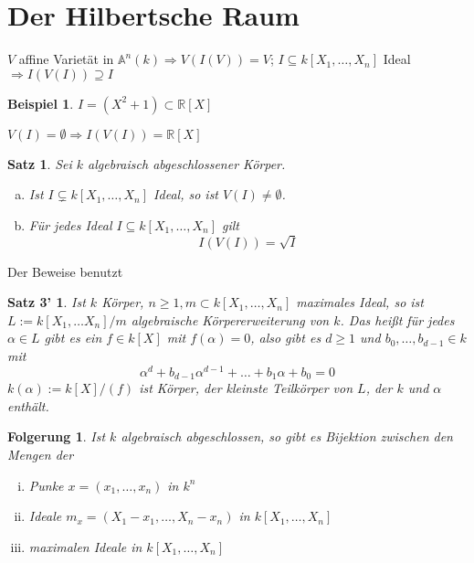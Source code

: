\documentclass[a4paper, 12pt, numbers=noendperiod, chapterprefix=true]{scrbook}
\theoremstyle{break}
\newtheorem{Satz}{Satz}
\newtheorem{Folg}[Def]{Folgerung}
\theoremstyle{nonumberbreak}
\newtheorem{nnBsp}{Beispiel}
\newtheorem{nnSatz3}{Satz 3'} %
\theoremstyle{nonumberplain}
\newcommand{\R}{\mathbb{R}}
\newcommand{\A}{\mathbb{A}}
\begin{document}

\section{Der Hilbertsche Raum}

$V$ affine Variet\"at in $ \A ^n(k) \Rightarrow V(I(V))=V$; $I\subseteq k[X_1,\dots ,X_n]$ Ideal $\Rightarrow I(V(I))\supseteq I$

\begin{nnBsp}
$I=(X^2+1)\subset\R[X]$

$V(I)=\emptyset \Rightarrow I(V(I)) = \R[X]$
\end{nnBsp}

\begin{Satz}\label{satz3}
Sei $k$ algebraisch abgeschlossener K\"orper.\begin{enumerate}[a)]
\item\label{satz3a}
	Ist $I\subsetneq k[X_1,\dots ,X_n]$ Ideal, so ist $V(I)\not=\emptyset$.
\item
	F\"ur jedes Ideal $I\subseteq k[X_1,\dots ,X_n]$ gilt
		\[I(V(I)) = \sqrt I\]
\end{enumerate}\end{Satz}

Der Beweise benutzt

\begin{nnSatz3}\label{hilfsatz3}
Ist $k$ K\"orper, $n\ge1, m\subset k[X_1,\dots ,X_n]$ maximales Ideal, so ist $L:=k[X_1,\dots X_n]/m$ \emph{algebraische} K\"orpererweiterung von $k$. Das hei\ss t f\"ur jedes $\alpha\in L$ gibt es ein $f\in k[X]$ mit $f(\alpha)=0$, also gibt es $d\ge1$ und $b_0,\dots ,b_{d-1}\in k$ mit
	\[\alpha^d+b_{d-1}\alpha^{d-1}+\dots +b_1\alpha + b_0=0\]
$k(\alpha):=k[X]/(f)$ ist K\"orper, der kleinste Teilk\"orper von $L$, der $k$ und $\alpha$ enth\"alt.
\end{nnSatz3}

\begin{Folg}\label{folg5.1}
Ist $k$ algebraisch abgeschlossen, so gibt es Bijektion zwischen den Mengen der\begin{enumerate}[i)]
\item
	Punke $x=(x_1,\dots ,x_n)$ in $k^n$
\item
	Ideale $m_x=(X_1-x_1,\dots ,X_n-x_n)$ in $k[X_1,\dots ,X_n]$
\item
	maximalen Ideale in $k[X_1,\dots ,X_n]$
\end{enumerate}\end{Folg}
\end{document}
